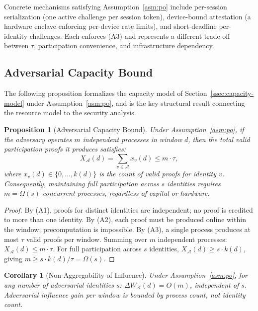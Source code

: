 \documentclass[10pt,journal,twoside]{IEEEtran}
\newtheorem{corollary}[theorem]{Corollary}
\newtheorem{proposition}[theorem]{Proposition}
\theoremstyle{remark}
\begin{document}
	Concrete mechanisms satisfying Assumption~\ref{asm:po}
	include per-session serialization (one active challenge
	per session token), device-bound attestation (a hardware
	enclave enforcing per-device rate limits), and
	short-deadline per-identity challenges.
	Each enforces (A3) and represents a different trade-off
	between $\tau$, participation convenience, and
	infrastructure dependency.
	
	\subsection{Adversarial Capacity Bound}
	\label{ssec:capacity}
	
	The following proposition formalizes the capacity model
	of Section~\ref{ssec:capacity-model} under
	Assumption~\ref{asm:po}, and is the key structural result
	connecting the resource model to the security analysis.
	
	\begin{proposition}[Adversarial Capacity Bound]
		\label{prop:capacity}
		Under Assumption~\ref{asm:po}, if the adversary
		operates $m$ independent processes in window $d$,
		then the total valid participation proofs it produces
		satisfies:
		\[
		X_{\mathcal{A}}(d)
		= \sum_{v \in \mathcal{A}} x_v(d)
		\leq m \cdot \tau,
		\]
		where $x_v(d) \in \{0, \ldots, k(d)\}$ is the count
		of valid proofs for identity $v$.
		Consequently, maintaining full participation across
		$s$ identities requires $m = \Omega(s)$ concurrent
		processes, regardless of capital or hardware.
	\end{proposition}
	
	\begin{proof}
		By (A1), proofs for distinct identities are
		independent; no proof is credited to more than one
		identity.
		By (A2), each proof must be produced online within
		the window; precomputation is impossible.
		By (A3), a single process produces at most $\tau$
		valid proofs per window.
		Summing over $m$ independent processes:
		$X_{\mathcal{A}}(d) \leq m \cdot \tau$.
		For full participation across $s$ identities,
		$X_{\mathcal{A}}(d) \geq s \cdot k(d)$, giving
		$m \geq s \cdot k(d)/\tau = \Omega(s)$.
	\end{proof}
	
	\begin{corollary}[Non-Aggregability of Influence]
		\label{cor:nonamort}
		Under Assumption~\ref{asm:po}, for any number of
		adversarial identities $s$:
		$\Delta W_{\mathcal{A}}(d) = O(m)$, independent of
		$s$.
		Adversarial influence gain per window is bounded by
		process count, not identity count.
	\end{corollary}
	
\end{document}
